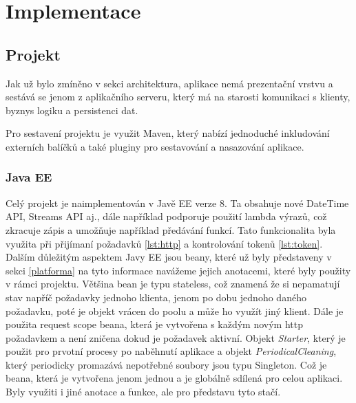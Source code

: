 \chapter{Implementace}


\section{Projekt}
Jak už bylo zmíněno v sekci architektura, aplikace nemá prezentační vrstvu a sestává se jenom z aplikačního serveru, který má na starosti komunikaci s klienty, byznys logiku a persistenci dat.
\par
Pro sestavení projektu je využit Maven, který nabízí jednoduché inkludování externích balíčků a také pluginy pro sestavování a nasazování aplikace. 

\subsection{Java EE}
Celý projekt je naimplementován v Javě EE verze 8. Ta obsahuje nové DateTime API, Streams API aj., dále například podporuje použití lambda výrazů, což zkracuje zápis a umožňuje například předávání funkcí. Tato funkcionalita byla využita při přijímaní požadavků \ref{lst:http} a kontrolování tokenů \ref{lst:token}. Dalším důležitým aspektem Javy EE jsou beany, které už byly představeny v sekci \ref{platforma} na tyto informace navážeme jejich anotacemi, které byly použity v rámci projektu. Většina bean je typu stateless, což znamená že si nepamatují stav napříč požadavky jednoho klienta, jenom po dobu jednoho daného požadavku, poté je objekt vrácen do poolu a může ho využít jiný klient. Dále je použita request scope beana, která je vytvořena s každým novým http požadavkem a není zničena dokud je požadavek aktivní. Objekt \textit{Starter}, který je použit pro prvotní procesy po naběhnutí aplikace a objekt \textit{PeriodicalCleaning}, který periodicky promazává nepotřebné soubory jsou typu Singleton. Což je beana, která je vytvořena jenom jednou a je globálně sdílená pro celou aplikaci. Byly využiti i jiné anotace a funkce, ale pro představu tyto stačí.

